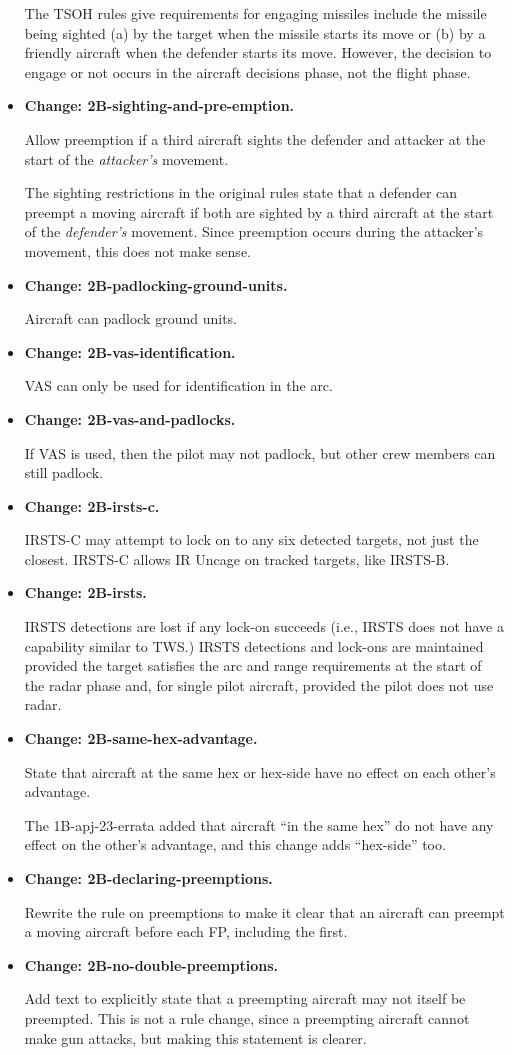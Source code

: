 \documentclass[10pt]{report}
\newcommand{\itemtag}[1]{\item \textbf{Change: #1.}\par}
\begin{document}
\begin{itemize}
    The TSOH rules give requirements for engaging missiles include the missile being sighted (a) by the target when the missile starts its move or (b) by a friendly aircraft when the defender starts its move. However, the decision to engage or not occurs in the aircraft decisions phase, not the flight phase. 

    \itemtag{2B-sighting-and-pre-emption} Allow preemption if a third aircraft sights the defender and attacker at the start of the \emph{attacker's} movement.
    
    The sighting restrictions in the original rules state that a defender can preempt a moving aircraft if both are sighted by a third aircraft at the start of the \emph{defender's} movement. Since preemption occurs during the attacker's movement, this does not make sense.

    \itemtag{2B-padlocking-ground-units} Aircraft can padlock ground units.

    \itemtag{2B-vas-identification} VAS can only be used for identification in the  arc.
    
    \itemtag{2B-vas-and-padlocks} If VAS is used, then the pilot may not padlock, but other crew members can still padlock.

    \itemtag{2B-irsts-c} IRSTS-C may attempt to lock on to any six detected targets, not just the closest. IRSTS-C allows IR Uncage on tracked targets, like IRSTS-B.
    
    \itemtag{2B-irsts} IRSTS detections are lost if any lock-on succeeds (i.e., IRSTS does not have a capability similar to TWS.) IRSTS detections and lock-ons are maintained provided the target satisfies the arc and range requirements at the start of the radar phase and, for single pilot aircraft, provided the pilot does not use radar.

    \itemtag{2B-same-hex-advantage} State that aircraft at the same hex or hex-side have no effect on each other's advantage.  
    
    The 1B-apj-23-errata added that aircraft “in the same hex” do not have any effect on the other's advantage, and this change adds “hex-side” too.
    
    \itemtag{2B-declaring-preemptions} Rewrite the rule on preemptions to make it clear that an aircraft can preempt a moving aircraft before each FP, including the first.

    \itemtag{2B-no-double-preemptions} Add text to explicitly state that a preempting aircraft may not itself be preempted. This is not a rule change, since a preempting aircraft cannot make gun attacks, but making this statement is clearer.


\end{itemize}
\end{document}
